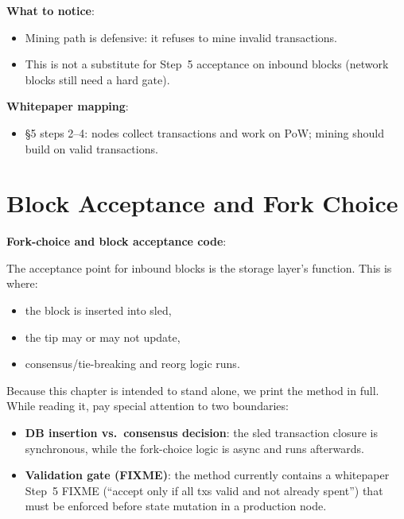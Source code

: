 \textbf{What to notice}:
\begin{itemize}
  \item Mining path is defensive: it refuses to mine invalid transactions.
  \item This is not a substitute for Step~5 acceptance on inbound blocks (network blocks still need a hard gate).
\end{itemize}

\textbf{Whitepaper mapping}:
\begin{itemize}
  \item \S5 steps 2--4: nodes collect transactions and work on PoW; mining should build on valid transactions.
\end{itemize}

\section{Block Acceptance and Fork Choice}
\label{sec:ch09-7-fork-choice}

\textbf{Fork-choice and block acceptance code}: 

The acceptance point for inbound blocks is the storage layer's  function. This is where:

\begin{itemize}
  \item the block is inserted into sled,
  \item the tip may or may not update,
  \item consensus/tie-breaking and reorg logic runs.
\end{itemize}

Because this chapter is intended to stand alone, we print the method in full. While reading it, pay special attention to two boundaries:

\begin{itemize}
  \item \textbf{DB insertion vs.\ consensus decision}: the sled transaction closure is synchronous, while the fork-choice logic is async and runs afterwards.
  \item \textbf{Validation gate (FIXME)}: the method currently contains a whitepaper Step~5 FIXME (``accept only if all txs valid and not already spent'') that must be enforced before state mutation in a production node.
\end{itemize}

